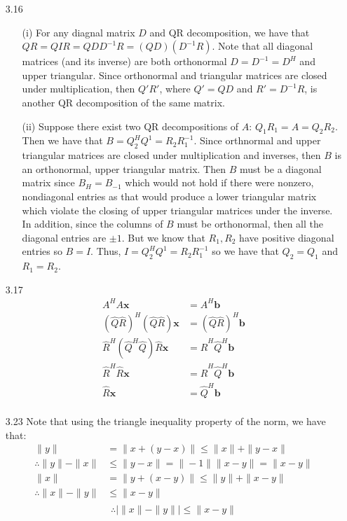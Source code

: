 \documentclass[letterpaper,12pt]{article}
\theoremstyle{definition}
\begin{document}
\begin{enumerate}
        \item[3.16]
          \begin{enumerate}
            \item[(i)]
            For any diagnal matrix $D$ and QR decomposition, we have that $QR = QIR = QDD^{-1}R = (QD)(D^{-1}R)$. Note that all diagonal matrices (and its inverse) are both orthonormal $D = D^{-1} = D^H$ and upper triangular. Since orthonormal and triangular matrices are closed under multiplication, then $Q'R'$, where $Q' = QD$ and $R' = D^{-1}R$, is another QR decomposition of the same matrix.
            \item[(ii)]
            Suppose there exist two QR decompositions of $A$: $Q_1R_1 = A = Q_2R_2$. Then we have that $B = Q_2^HQ^1 = R_2R_1^{-1}$. Since orthnormal and upper triangular matrices are closed under multiplication and inverses, then $B$ is an orthonormal, upper triangular matrix. Then $B$ must be a diagonal matrix since $B_H = B_{-1}$ which would not hold if there were nonzero, nondiagonal entries as that would produce a lower triangular matrix which violate the closing of upper triangular matrices under the inverse. In addition, since the columns of $B$ must be orthonormal, then all the diagonal entries are $\pm1$. But we know that $R_1, R_2$ have positive diagonal entries so $B = I$. Thus, $I = Q_2^HQ^1 = R_2R_1^{-1}$ so we have that $Q_2 = Q_1$ and $R_1 = R_2$.
          \end{enumerate}

        \item[3.17]
          \begin{align*}
            A^HA\mathbf{x} &= A^H\mathbf{b} \\
            (\widehat{Q}\widehat{R})^H(\widehat{Q}\widehat{R})\mathbf{x} &=   (\widehat{Q}\widehat{R})^H\mathbf{b} \\
            \widehat{R}^H(\widehat{Q}^H\widehat{Q})\widehat{R}\mathbf{x} &=   \widehat{R}^H\widehat{Q}^H\mathbf{b} \\
            \widehat{R}^H\widehat{R}\mathbf{x} &= \widehat{R}^H\widehat{Q}^H\mathbf{b} \\
            \widehat{R}\mathbf{x} &= \widehat{Q}^H\mathbf{b} \\
          \end{align*}

        \item[3.23]
          Note that using the triangle inequality property of the norm, we have that:
          \begin{align*}
            \|y\| &= \|x+(y-x)\| \leq \|x\| + \|y-x\| \\
            \therefore \|y\| - \|x\| & \leq \|y-x\| = \|-1\|\|x-y\| = \|x-y\| \\
            \|x\| &= \|y+(x-y)\| \leq \|y\| + \|x-y\| \\
            \therefore \|x\| - \|y\| & \leq \|x-y\| \\
          \end{align*}
          \begin{equation*}
            \therefore |\|x\| - \|y\|| \leq \|x-y\|
          \end{equation*}


\end{enumerate}
\end{document}
